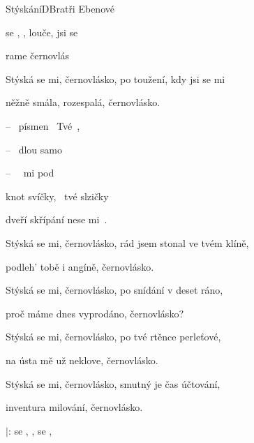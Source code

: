 \setcounter{page}{83}
\begin{song}{Stýskání}{D}{Bratři Ebenové}
\begin{SBVerse}
 se , ,  louče,  jsi se  

 rame  černovlás

\end{SBVerse}
\begin{SBVerse}

Stýská se mi, černovlásko, po toužení, kdy jsi se mi

něžně smála, rozespalá, černovlásko.

\end{SBVerse}
\begin{SBChorus}
 --  písmen  Tvé ,

 --  dlou samo

 --   mi pod 

 knot svíčky,  tvé slzičky

dveří skřípání nese mi .

  \end{SBChorus}
\begin{SBVerse}
Stýská se mi, černovlásko, rád jsem stonal ve tvém klíně,

podleh' tobě i angíně, černovlásko.
\end{SBVerse}
\begin{SBVerse}

Stýská se mi, černovlásko, po snídání v deset ráno,

proč máme dnes vyprodáno, černovlásko?

  \end{SBVerse}
  \begin{SBVerse}
Stýská se mi, černovlásko, po tvé rtěnce perleťové,

na ústa mě už neklove, černovlásko.

\end{SBVerse}
\begin{SBVerse}

Stýská se mi, černovlásko, smutný je čas účtování,

inventura milování, černovlásko.

  \end{SBVerse}
\begin{SBChorus*}
 $|$:  se , ,   se , 
 \end{SBChorus*}
 \end{song}

\pagebreak
